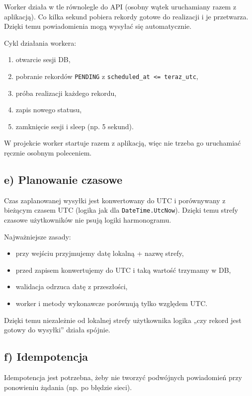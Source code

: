 \documentclass[a4paper,12pt]{article}
\begin{document}
Worker działa w tle równolegle do API (osobny wątek uruchamiany razem z aplikacją). Co kilka sekund pobiera rekordy gotowe do realizacji i je przetwarza. Dzięki temu powiadomienia mogą wysyłać się automatycznie.

Cykl działania workera:
\begin{enumerate}[leftmargin=1.8em]
    \item otwarcie sesji DB,
    \item pobranie rekordów \texttt{PENDING} z \texttt{scheduled\_at <= teraz\_utc},
    \item próba realizacji każdego rekordu,
    \item zapis nowego statusu,
    \item zamknięcie sesji i sleep (np. 5 sekund).
\end{enumerate}

W projekcie worker startuje razem z aplikacją, więc nie trzeba go uruchamiać ręcznie osobnym poleceniem.

\subsection*{e) Planowanie czasowe}

Czas zaplanowanej wysyłki jest konwertowany do UTC i porównywany z bieżącym czasem UTC (logika jak dla \texttt{DateTime.UtcNow}). Dzięki temu strefy czasowe użytkowników nie psują logiki harmonogramu.

Najważniejsze zasady:
\begin{itemize}[leftmargin=1.5em]
    \item przy wejściu przyjmujemy datę lokalną + nazwę strefy,
    \item przed zapisem konwertujemy do UTC i taką wartość trzymamy w DB,
    \item walidacja odrzuca datę z przeszłości,
    \item worker i metody wykonawcze porównują tylko względem UTC.
\end{itemize}

Dzięki temu niezależnie od lokalnej strefy użytkownika logika „czy rekord jest gotowy do wysyłki” działa spójnie.

\subsection*{f) Idempotencja}

Idempotencja jest potrzebna, żeby nie tworzyć podwójnych powiadomień przy ponowieniu żądania (np. po błędzie sieci).
\end{document}
